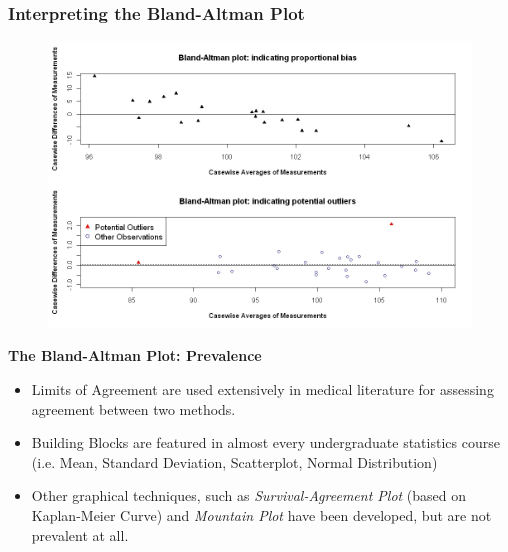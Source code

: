 \documentclass[compress]{beamer}        %
\makeatletter
\newcommand{\tcb}{\textcolor{beamer@blendedblue}}
\makeatother
\begin{document}
		\begin{frame}
			\frametitle{Interpreting the Bland-Altman Plot}
			\begin{figure}
				\centering
				\includegraphics[width=0.9\linewidth]{images/BAcombi}
				\caption{}
				\label{fig:BAcombi}
			\end{figure}
			
		\end{frame}
		\begin{frame}{\bf \tcb{The Bland-Altman Plot: Prevalence}}
			\large
			\begin{itemize}\itemsep0.7cm
				
				\item Limits of Agreement are used extensively in medical literature for assessing agreement between two methods.
				\item Building Blocks are featured in almost every undergraduate statistics course (i.e. Mean, Standard Deviation, Scatterplot, Normal Distribution)
				\item Other graphical techniques, such as \textit{Survival-Agreement Plot} (based on Kaplan-Meier Curve) and \textit{Mountain Plot} have been developed, but are not prevalent at all.
			\end{itemize}
		\end{frame}
		
\end{document}
